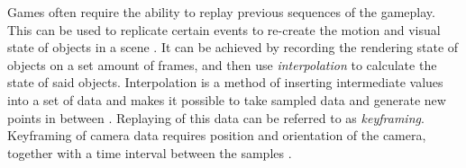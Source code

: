 
Games often require the ability to replay previous sequences of the gameplay. This can be used to replicate certain events to re-create the motion and visual state of objects in a scene \cite{haigh-hutchinson_real-time_2009}. It can be achieved by recording the rendering state of objects on a set amount of frames, and then use \textit{interpolation} to calculate the state of said objects. Interpolation is a method of inserting intermediate values into a set of data and makes it possible to take sampled data and generate new points in between \cite{haigh-hutchinson_real-time_2009}. Replaying of this data can be referred to as \textit{keyframing}. Keyframing of camera data requires position and orientation of the camera, together with a time interval between the samples \cite{haigh-hutchinson_real-time_2009}.